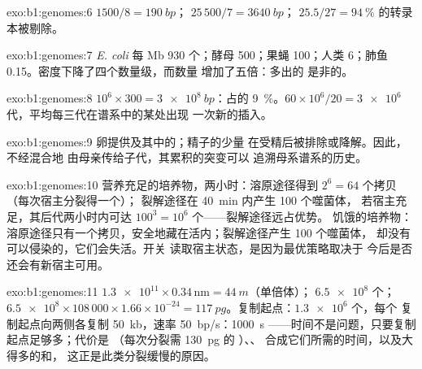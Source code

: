 \begin{solution}{exo:b1:genomes:6}
 $1500/8 = \qty{190}{bp}$； $25\,500/7 = \qty{3640}{bp}$；
$25.5/27 = \qty{94}{\%}$ 的转录本被剔除。
\end{solution}

\begin{solution}{exo:b1:genomes:7}
\emph{E. coli} 每 Mb 930 个；酵母 500；果蝇 100；人类 6；肺鱼
0.15。密度下降了四个数量级，而数量
增加了五倍：多出的  是非的。
\end{solution}

\begin{solution}{exo:b1:genomes:8}
$10^6\times 300 = \qty{3e8}{bp}$：占的 \qty{9}{\%}。$60\times
10^6/20 = \num{3e6}$ 代，平均每三代在谱系中的某处出现
一次新的插入。
\end{solution}

\begin{solution}{exo:b1:genomes:9}
卵提供及其中的；精子的少量
在受精后被排除或降解。因此，  不经混合地
由母亲传给子代，其累积的突变可以
追溯母系谱系的历史。
\end{solution}

\begin{solution}{exo:b1:genomes:10}
营养充足的培养物，两小时：溶原途径得到 $2^6 = 64$ 个拷贝（每次宿主分裂得一个）；
裂解途径在 \qty{40}{min} 内产生 100 个噬菌体，
若宿主充足，其后代两小时内可达 $100^3 = 10^6$ 个——裂解途径远占优势。
饥饿的培养物：溶原途径只有一个拷贝，安全地藏在活内；裂解途径产生 100 个噬菌体，
却没有可以侵染的，它们会失活。开关
读取宿主状态，是因为最优策略取决于
今后是否还会有新宿主可用。
\end{solution}

\begin{solution}{exo:b1:genomes:11}
$\num{1.3e11}\times 0.34\,\mathrm{nm} = \qty{44}{m}$（单倍体）；
$\num{6.5e8}$ 个； $\num{6.5e8}\times 108\,000\times
1.66\times 10^{-24} = \qty{117}{pg}$。复制起点：$\num{1.3e6}$ 个，每个
复制起点向两侧各复制 \qty{50}{kb}，速率 \qty{50}{bp/s}：\qty{1000}{s}
——时间不是问题，只要复制起点足够多；代价是
（每次分裂需 \qty{130}{pg} 的 ）、、
合成它们所需的时间，以及大得多的和，
这正是此类分裂缓慢的原因。
\end{solution}

